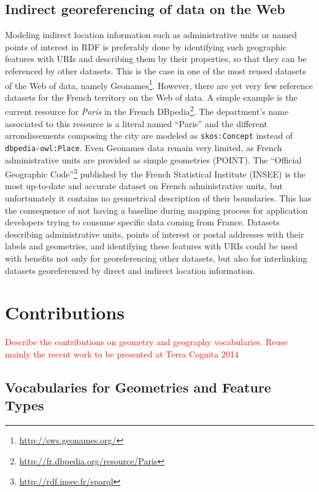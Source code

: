 \subsection{Indirect georeferencing of data on the Web}
\label{sec:indirectgeo}
Modeling indirect location information such as administrative units or named points of interest in RDF is preferably done by identifying such geographic features with URIs and describing them by their properties, so that they can be referenced by other datasets. This is the case in one of the most reused datasets of the Web of data, namely Geonames\footnote{\url{http://sws.geonames.org/}}. However, there are yet very few reference datasets for the French territory on the Web of data.  A simple example is the current resource for \textit{Paris} in the French DBpedia\footnote{\url{http://fr.dbpedia.org/resource/Paris}}. The department's name associated to this resource is a literal named ``Paris'' and the different arrondissements composing the city are modeled as \texttt{skos:Concept} instead of \texttt{dbpedia-owl:Place}. Even Geonames data remain very limited, as French administrative units are provided as simple geometries (POINT). The ``Official Geographic Code''\footnote{\url{http://rdf.insee.fr/sparql}} published by the French Statistical Institute (INSEE) is the most up-to-date and accurate dataset on French administrative units, but unfortunately it contains no geometrical description of their boundaries. This has the consequence of not having a baseline during mapping process for application developers trying to consume specific data coming from France. Datasets describing administrative units, points of interest or postal addresses with their labels and geometries, and identifying these features with URIs could be used with benefits not only for georeferencing other datasets, but also for interlinking datasets georeferenced by direct and indirect location information.


\section{Contributions}

\textcolor{red}{Describe the contributions on geometry and geography vocabularies. Reuse mainly the recent work to be presented at Terra Cognita 2014}

\subsection{Vocabularies for Geometries and Feature Types} \label{sec:topovocab}

